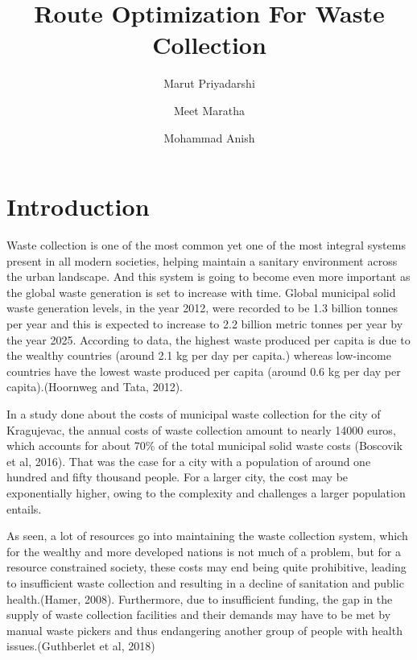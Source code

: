 \documentclass[12pt]{article}
\begin{document}

\title{Route Optimization For Waste Collection\\}

\author[1]{Marut Priyadarshi}
\author[2]{Meet Maratha}
\author[3]{Mohammad Anish}

\maketitle

\section{Introduction}
Waste collection is one of the most common yet one of the most integral systems present in all modern societies, helping maintain a sanitary environment across the urban landscape. And this system is going to become even more important as the global waste generation is set to increase with time. Global municipal solid waste generation levels, in the year 2012, were recorded to be 1.3 billion tonnes per year and this is expected to increase to 2.2 billion metric tonnes per year by the year 2025. According to data, the highest waste produced per capita is due to the wealthy countries (around 2.1 kg per day per capita.) whereas low-income countries have the lowest waste produced per capita (around 0.6 kg per day per capita).(Hoornweg and Tata, 2012).

In a study done about the costs of municipal waste collection for the city of Kragujevac, the annual costs of waste collection amount to nearly 14000 euros, which accounts for about 70\% of the total municipal solid waste costs (Boscovik et al, 2016). That was the case for a city with a population of around one hundred and fifty thousand people. For a larger city, the cost may be exponentially higher, owing to the complexity and challenges a larger population entails.

As seen, a lot of resources go into maintaining the waste collection system, which for the wealthy and more developed nations is not much of a problem, but for a resource constrained society, these costs may end being quite prohibitive, leading to insufficient waste collection and resulting in a decline of sanitation and public health.(Hamer, 2008). Furthermore, due to insufficient funding, the gap in the supply of waste collection facilities and their demands may have to be met by manual waste pickers and thus endangering another group of people with health issues.(Guthberlet et al, 2018)
\end{document}
